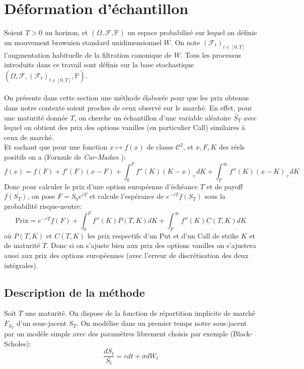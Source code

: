 \documentclass[a4paper,12pt]{report}
\numberwithin{equation}{section}
\theoremstyle{definition}
\numberwithin{equation}{section}
\begin{document}
\chapter{Déformation d'échantillon}
\label{defsection}
Soient $T>0$ un horizon, et $\left( \Omega, \mathcal{F}, \mathbb{P} \right)$ un espace probabilisé sur lequel on définie un mouvement brownien standard unidimensionnel $W$. On note $\left( \mathcal{F}_t \right)_{t \in [0, T]}$ l'augmentation habituelle de la filtration canonique de $W$. Tous les processus introduits dans ce travail sont définis sur la base stochastique $\left( \Omega, \mathcal{F}, \left( \mathcal{F}_t \right)_{t \in [0, T]}, \mathbb{P}\right)$.\\\\ 
On présente dans cette section une méthode élaborée pour que les prix obtenus dans notre contexte soient proches de ceux observé sur le marché. En effet, pour une maturité donnée $T$, on cherche un échantillon d'une variable aléatoire $\bar{S}_T$ avec lequel on obtient des prix des options vanilles (en particulier Call) similaires à ceux de marché. \\
Et sachant que pour une fonction $x\mapsto f(x)$ de classe $\mathcal{C}^2$,  et $x, F, K$ des réels positifs on a (Formule de \textit{Car-Madan} \cite{CarMadan}):
\begin{equation*}
f(x)=f(F) + f'(F)(x-F)+\int_0^{F}f''(K)(K-x)_+dK +\int_F^{\infty} f''(K)(x-K)_+dK
\end{equation*}
Donc pour calculer le prix d'une option européenne d'échéance $T$ et de payoff $f(S_T)$, on pose $F = S_0 e^{rT}$ et calcule
l'espérance de $e^{-rT} f(S_T)$ sous la probabilité risque-neutre:
\begin{equation}
\label{car}
\mbox{Prix} = e^{-rT} f(F) + \int_0^{F}f''(K)P(T,K)dK +\int_F^{\infty} f''(K)C(T,K)dK
\end{equation}
où $P(T,K)$ et $C(T,K)$ les prix respectifs d'un Put et d'un Call de strike $K$ et de maturité $T$. Donc si on s'ajuste bien aux prix des options vanilles on s'ajustera aussi aux prix des options européennes (avec l'erreur de discrétisation des deux intégrales).

\label{def}
\section{Description de la méthode}
Soit $T$ une maturité. On dispose de la fonction de répartition implicite de marché $F_{S_T}$ d'un sous-jacent $S_{T}$. On modélise dans un premier temps notre sous-jacent par un modèle simple avec des paramètres librement choisis par exemple (Black-Scholes):
\begin{equation}
\label{bs}
\frac{dS_{t}}{S_{t}}=rdt+\sigma dW_{t}
\end{equation}
\end{document}
